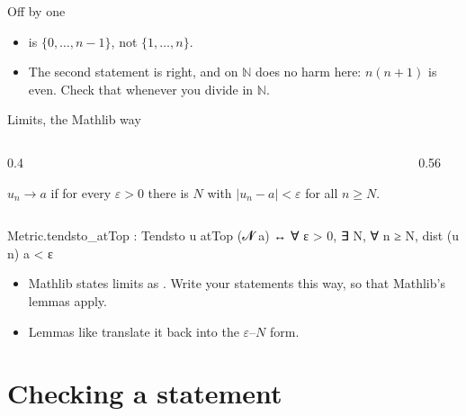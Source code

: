 \documentclass[10pt, aspectratio=169]{beamer}
\begin{document}
\begin{frame}[fragile]{Off by one}

\vspace{0.4em}
\begin{itemize}
\item {} is $\{0, \dots, n-1\}$, not $\{1, \dots, n\}$.
\item The second statement is right, and \lc{/} on $\mathbb{N}$ does no harm here: $n(n+1)$ is even. Check that whenever you divide in $\mathbb{N}$.
\end{itemize}
\end{frame}

\begin{frame}[fragile]{Limits, the Mathlib way}
\begin{columns}[T]
\begin{column}{0.4\textwidth}
\begin{paper}[Definition]
$u_n \to a$ if for every $\varepsilon > 0$ there is $N$ with $|u_n - a| < \varepsilon$ for all $n \ge N$.
\end{paper}
\end{column}
\begin{column}{0.56\textwidth}
\leanlabel
{}
\end{column}
\end{columns}

\vspace{0.4em}
\begin{leanout}
Metric.tendsto_atTop : Tendsto u atTop (𝓝 a) ↔
  ∀ ε > 0, ∃ N, ∀ n ≥ N, dist (u n) a < ε
\end{leanout}

\begin{itemize}
\item Mathlib states limits as . Write your statements this way, so that Mathlib's lemmas apply.
\item Lemmas like  translate it back into the $\varepsilon$--$N$ form.
\end{itemize}
\end{frame}

\section{Checking a statement}
\end{document}
